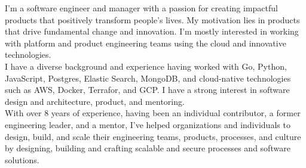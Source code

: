 \documentclass[9pt]{developercv} %
\begin{document}


\begin{minipage}[t]{1\textwidth} %
    {  
        I'm a software engineer and manager with a passion for creating impactful products 
        that positively transform people's lives. My motivation lies in products that drive fundamental 
        change and innovation. I'm mostly interested in working with platform and product engineering 
        teams using the cloud and innovative technologies. \\

        I have a diverse background and experience having worked with Go, Python, JavaScript, Postgres, 
        Elastic Search, MongoDB, and cloud-native technologies such as AWS, Docker, Terrafor, and 
        GCP. I have a strong interest in software design and architecture, product, and mentoring. \\ 
    
        With over 8 years of experience, having been an individual contributor, a former engineering 
        leader, and a mentor, I've helped organizations and individuals to design, build, and scale 
        their engineering teams, products, processes, and culture by designing, building and crafting 
        scalable and secure processes and software solutions. 
    }
\end{minipage}



\end{document}
